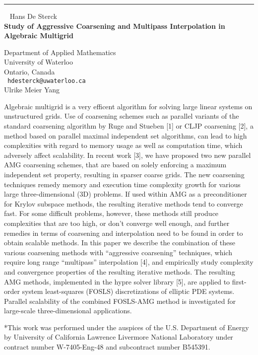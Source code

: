 \documentclass{report}
\begin{document}
\begin{center}

\rule{6in}{1pt} \
{\large
Hans De Sterck
\\ {\bf
Study of Aggressive Coarsening and Multipass Interpolation in Algebraic
Multigrid
}}

Department of Applied Mathematics
\\ University of Waterloo \\
Ontario, Canada
\\ {\tt
hdesterck@uwaterloo.ca
}
\\
Ulrike Meier Yang
\end{center}

Algebraic multigrid is a very efficent algorithm for solving large
linear systems on unstructured grids. Use of coarsening schemes such as
parallel variants of the standard coarsening algorithm by Ruge and
Stueben [1] or CLJP coarsening [2], a method based on parallel maximal
independent set algorithms, can lead to high complexities with regard
to memory usage as well as computation time, which adversely affect
scalability.
In recent work [3], we have proposed two new parallel AMG coarsening
schemes, that are based on solely enforcing a maximum independent set
property, resulting in sparser coarse grids. The new coarsening
techniques remedy memory and execution time complexity growth for
various large three-dimensional (3D) problems. If used within AMG as a
preconditioner for Krylov subspace methods, the resulting iterative
methods tend to converge fast. For some difficult problems, however,
these methods still produce complexities that are too high, or don't
converge well enough, and further remedies in terms of coarsening and
interpolation need to be found in order to obtain scalable methods.
In this paper we describe the combination of these various coarsening
methods with ``aggressive coarsening'' techniques, which require long
range ``multipass'' interpolation [4], and empirically study complexity
and convergence properties of the resulting iterative methods. The
resulting AMG methods, implemented in the hypre solver library [5], are
applied to first-order system least-squares (FOSLS) discretizations of
elliptic PDE systems. Parallel scalability of the combined FOSLS-AMG
method is investigated for large-scale three-dimensional applications.

*This work was performed under the auspices of the U.S. Department of
Energy by University of California Lawrence Livermore National
Laboratory under contract number W-7405-Eng-48 and subcontract number
B545391.
\end{document}
